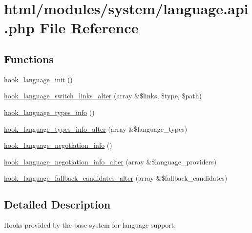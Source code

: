 \hypertarget{language_8api_8php}{
\section{html/modules/system/language.api.php File Reference}
\label{language_8api_8php}
}
\subsection*{Functions}
\begin{DoxyCompactItemize}
\item 
\hyperlink{group__hooks_ga6db3413f657addb6ebb32ac7d2561076}{hook\_\-language\_\-init} ()
\item 
\hyperlink{group__hooks_ga77186f4d805f77a8edc3bd8dd6041339}{hook\_\-language\_\-switch\_\-links\_\-alter} (array \&\$links, \$type, \$path)
\item 
\hyperlink{group__language__negotiation_ga8932d2167557c18966cd033cfbe0f37e}{hook\_\-language\_\-types\_\-info} ()
\item 
\hyperlink{group__language__negotiation_ga9752378ca7c389892fea3fb2960263dd}{hook\_\-language\_\-types\_\-info\_\-alter} (array \&\$language\_\-types)
\item 
\hyperlink{group__language__negotiation_gabcac4b239272ba30c6320a0af2fab46e}{hook\_\-language\_\-negotiation\_\-info} ()
\item 
\hyperlink{group__language__negotiation_gacaed046505a0a8470514731b86910089}{hook\_\-language\_\-negotiation\_\-info\_\-alter} (array \&\$language\_\-providers)
\item 
\hyperlink{group__hooks_gad5f456f0d7ae7ddc81a0f49ce66fb1a4}{hook\_\-language\_\-fallback\_\-candidates\_\-alter} (array \&\$fallback\_\-candidates)
\end{DoxyCompactItemize}


\subsection{Detailed Description}
Hooks provided by the base system for language support. 